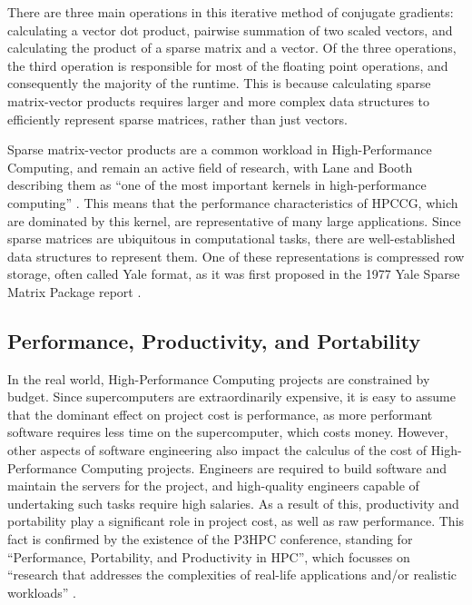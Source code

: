 There are three main operations in this iterative method of conjugate gradients: calculating a vector dot product, pairwise summation of two scaled vectors, and calculating the product of a sparse matrix and a vector. Of the three operations, the third operation is responsible for most of the floating point operations, and consequently the majority of the runtime. This is because calculating sparse matrix-vector products requires larger and more complex data structures to efficiently represent sparse matrices, rather than just vectors.

Sparse matrix-vector products are a common workload in High-Performance Computing, and remain an active field of research, with Lane and Booth describing them as ``one of the most important kernels in high-performance computing'' \cite{laneHeterogeneousSparseMatrixVector2023}. This means that the performance characteristics of HPCCG, which are dominated by this kernel, are representative of many large applications. Since sparse matrices are ubiquitous in computational tasks, there are well-established data structures to represent them. One of these representations is compressed row storage, often called Yale format, as it was first proposed in the 1977 Yale Sparse Matrix Package report \cite{eisenstat1977yale}.

\subsection{Performance, Productivity, and Portability}
\label{ssec:p3hpc} %

In the real world, High-Performance Computing projects are constrained by budget. Since supercomputers are extraordinarily expensive, it is easy to assume that the dominant effect on project cost is performance, as more performant software requires less time on the supercomputer, which costs money. However, other aspects of software engineering also impact the calculus of the cost of High-Performance Computing projects. Engineers are required to build software and maintain the servers for the project, and high-quality engineers capable of undertaking such tasks require high salaries. As a result of this, productivity and portability play a significant role in project cost, as well as raw performance. This fact is confirmed by the existence of the P3HPC conference, standing for ``Performance, Portability, and Productivity in HPC'', which focusses on ``research that addresses the complexities of real-life applications and/or realistic workloads'' \cite{P3HPC}.

